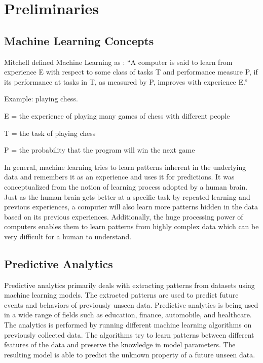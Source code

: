 \documentclass[11pt,openright]{report}
\begin{document}
\section{Preliminaries}\label{section:preliminaries}

\subsection{Machine Learning Concepts}

\noindent  Mitchell defined Machine Learning as \cite{Mitchell1997}: 
\newline\newline
\hangindent=0.7cm ``A computer is said to learn from experience E with respect to some class of tasks T and performance measure P, if its performance at tasks in T, as measured by P, improves with experience E.'' \newline 

\noindent Example: playing chess.

\noindent E = the experience of playing many games of chess with different people

\noindent T = the task of playing chess

\noindent P = the probability that the program will win the next game \newline 

\noindent In general, machine learning tries to learn patterns inherent in the underlying data and remembers it as an experience and uses it for predictions. It was conceptualized from the notion of learning process adopted by a human brain. Just as the human brain gets better at a specific task by repeated learning and previous experiences, a computer will also learn more patterns hidden in the data based on its previous experiences. Additionally, the huge processing power of computers enables them to learn patterns from highly complex data which can be very difficult for a human to understand. 

\subsection{Predictive Analytics}
Predictive analytics primarily deals with extracting patterns from datasets using machine learning models. The extracted patterns are used to predict future events and behaviors of previously unseen data. Predictive analytics is being used in a wide range of fields such as education, finance, automobile, and healthcare. The analytics is performed by running different machine learning algorithms on previously collected data. The algorithms try to learn patterns between different features of the data and preserve the knowledge in model parameters. The resulting model is able to predict the unknown property of a future unseen data. 
\end{document}
